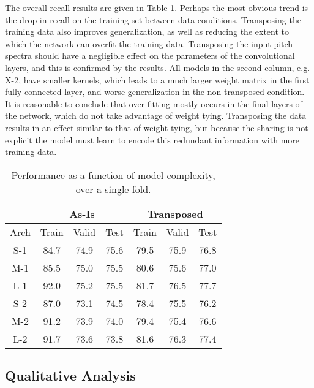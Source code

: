 The overall recall results are given in Table \ref{tab:exp2res}.
Perhaps the most obvious trend is the drop in recall on the training set between data conditions.
Transposing the training data also improves generalization, as well as reducing the extent to which the network can overfit the training data.
Transposing the input pitch spectra should have a negligible effect on the parameters of the convolutional layers, and this is confirmed by the results.
All models in the second column, e.g. X-2, have smaller kernels, which leads to a much larger weight matrix in the first fully connected layer, and worse generalization in the non-transposed condition.
It is reasonable to conclude that over-fitting mostly occurs in the final layers of the network, which do not take advantage of weight tying.
Transposing the data results in an effect similar to that of weight tying, but because the sharing is not explicit the model must learn to encode this redundant information with more training data.


\begin{table}[!t]
\caption{Performance as a function of model complexity, over a single fold.}
\label{tab:exp2res}
\centering
\begin{tabular}{ c || c c c || c c c |}
& \multicolumn{3}{c||}{As-Is} & \multicolumn{3}{|c|}{Transposed}\\
 \hline
Arch & Train & Valid & Test & Train & Valid & Test \\
\hline
S-1 & 84.7 & 74.9 & 75.6 & 79.5 & 75.9 & 76.8 \\
M-1 & 85.5 & 75.0 & 75.5 & 80.6 & 75.6 & 77.0 \\
L-1 & 92.0 & 75.2 & 75.5 & 81.7 & 76.5 & 77.7 \\
\hline
S-2 & 87.0 & 73.1 & 74.5 & 78.4 & 75.5 & 76.2 \\
M-2 & 91.2 & 73.9 & 74.0 & 79.4 & 75.4 & 76.6 \\
L-2 & 91.7 & 73.6 & 73.8 & 81.6 & 76.3 & 77.4 \\
\hline
\end{tabular}
\end{table}


\subsection{Qualitative Analysis}
\label{subsec:Qualitative_analysis}

